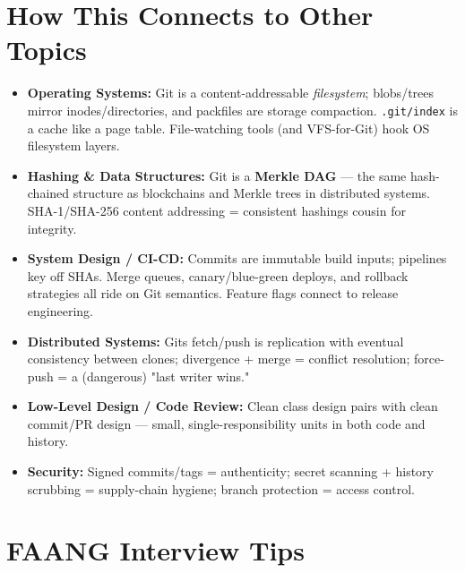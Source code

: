 \documentclass[11pt]{article}
\providecommand{\tightlist}{\setlength{\itemsep}{1pt}\setlength{\parskip}{0pt}}
\begin{document}
\section{How This Connects to Other Topics}\label{how-this-connects-to-other-topics}

\begin{itemize}
\tightlist
\item
  \textbf{Operating Systems:} Git is a content-addressable \emph{filesystem}; blobs/trees mirror inodes/directories, and packfiles are storage compaction. \texttt{.git/index} is a cache like a page table. File-watching tools (and VFS-for-Git) hook OS filesystem layers.
\item
  \textbf{Hashing \& Data Structures:} Git is a \textbf{Merkle DAG} --- the same hash-chained structure as blockchains and Merkle trees in distributed systems. SHA-1/SHA-256 content addressing = consistent hashing\textquotesingle s cousin for integrity.
\item
  \textbf{System Design / CI-CD:} Commits are immutable build inputs; pipelines key off SHAs. Merge queues, canary/blue-green deploys, and rollback strategies all ride on Git semantics. Feature flags connect to release engineering.
\item
  \textbf{Distributed Systems:} Git\textquotesingle s fetch/push is replication with eventual consistency between clones; divergence + merge = conflict resolution; force-push = a (dangerous) "last writer wins."
\item
  \textbf{Low-Level Design / Code Review:} Clean class design pairs with clean commit/PR design --- small, single-responsibility units in both code and history.
\item
  \textbf{Security:} Signed commits/tags = authenticity; secret scanning + history scrubbing = supply-chain hygiene; branch protection = access control.
\end{itemize}

\section{FAANG Interview Tips}\label{faang-interview-tips}
\end{document}
